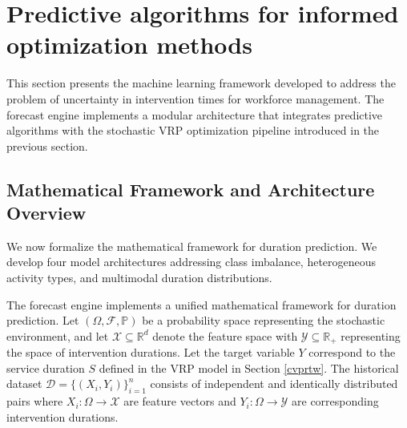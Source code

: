 \documentclass[preprint,12pt]{elsarticle}
\begin{document}

\section{Predictive algorithms for informed optimization methods}
\label{sec:predictive}

This section presents the machine learning framework developed to address the problem of uncertainty in intervention times for workforce management. The forecast engine implements a modular architecture that integrates predictive algorithms with the stochastic VRP optimization pipeline introduced in the previous section.



\subsection{Mathematical Framework and Architecture Overview}

We now formalize the mathematical framework for duration prediction. We develop four model architectures addressing class imbalance, heterogeneous activity types, and multimodal duration distributions.

The forecast engine implements a unified mathematical framework for duration prediction. Let $(\Omega, \mathcal{F}, \mathbb{P})$ be a probability space representing the stochastic environment, and let $\mathcal{X} \subseteq \mathbb{R}^d$ denote the feature space with $\mathcal{Y} \subseteq \mathbb{R}_+$ representing the space of intervention durations. Let the target variable $Y$ correspond to the service duration $S$ defined in the VRP model in Section \ref{cvprtw}. The historical dataset $\mathcal{D} = \{(X_i, Y_i)\}_{i=1}^n$ consists of independent and identically distributed pairs where $X_i: \Omega \to \mathcal{X}$ are feature vectors and $Y_i: \Omega \to \mathcal{Y}$ are corresponding intervention durations.
\end{document}
